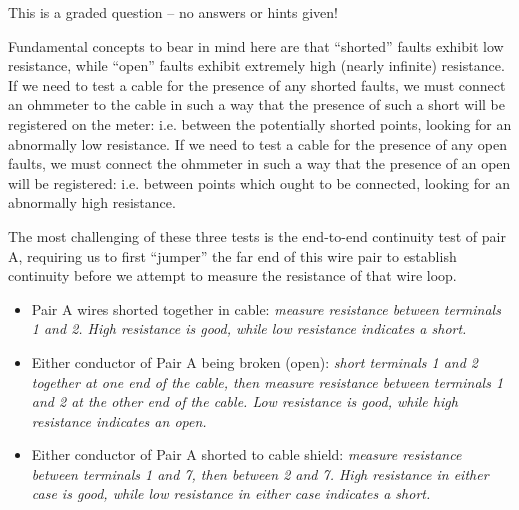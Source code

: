 \vfil 

\eject






This is a graded question -- no answers or hints given!







Fundamental concepts to bear in mind here are that ``shorted'' faults exhibit low resistance, while ``open'' faults exhibit extremely high (nearly infinite) resistance.  If we need to test a cable for the presence of any shorted faults, we must connect an ohmmeter to the cable in such a way that the presence of such a short will be registered on the meter: i.e. between the potentially shorted points, looking for an abnormally low resistance.  If we need to test a cable for the presence of any open faults, we must connect the ohmmeter in such a way that the presence of an open will be registered: i.e. between points which ought to be connected, looking for an abnormally high resistance.

\vskip 10pt

The most challenging of these three tests is the end-to-end continuity test of pair A, requiring us to first ``jumper'' the far end of this wire pair to establish continuity before we attempt to measure the resistance of that wire loop.

\vskip 10pt

\begin{itemize}
\item{} Pair A wires shorted together in cable: {\it measure resistance between terminals 1 and 2.  High resistance is good, while low resistance indicates a short.}
\vskip 10pt
\item{} Either conductor of Pair A being broken (open): {\it short terminals 1 and 2 together at one end of the cable, then measure resistance between terminals 1 and 2 at the other end of the cable.  Low resistance is good, while high resistance indicates an open.}
\vskip 10pt
\item{} Either conductor of Pair A shorted to cable shield: {\it measure resistance between terminals 1 and 7, then between 2 and 7.  High resistance in either case is good, while low resistance in either case indicates a short.}
\end{itemize}




